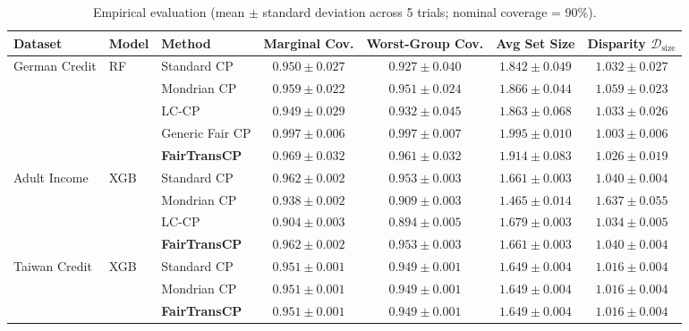 \documentclass[11pt,a4paper]{article}
\begin{document}
\begin{table}[htbp]
\centering
\small
\begin{tabularx}{\textwidth}{@{}lllcccc@{}}
\toprule
\textbf{Dataset} & \textbf{Model} & \textbf{Method} & \textbf{Marginal Cov.} & \textbf{Worst-Group Cov.} & \textbf{Avg Set Size} & \textbf{Disparity $\mathcal{D}_{\text{size}}$} \\
\midrule
German Credit & RF & Standard CP & $0.950 \pm 0.027$ & $0.927 \pm 0.040$ & $1.842 \pm 0.049$ & $1.032 \pm 0.027$ \\
& & Mondrian CP & $0.959 \pm 0.022$ & $0.951 \pm 0.024$ & $1.866 \pm 0.044$ & $1.059 \pm 0.023$ \\
& & LC-CP & $0.949 \pm 0.029$ & $0.932 \pm 0.045$ & $1.863 \pm 0.068$ & $1.033 \pm 0.026$ \\
& & Generic Fair CP & $0.997 \pm 0.006$ & $0.997 \pm 0.007$ & $1.995 \pm 0.010$ & $1.003 \pm 0.006$ \\
& & \textbf{FairTransCP} & $\mathbf{0.969 \pm 0.032}$ & $\mathbf{0.961 \pm 0.032}$ & $\mathbf{1.914 \pm 0.083}$ & $\mathbf{1.026 \pm 0.019}$ \\
\midrule
Adult Income & XGB & Standard CP & $0.962 \pm 0.002$ & $0.953 \pm 0.003$ & $1.661 \pm 0.003$ & $1.040 \pm 0.004$ \\
& & Mondrian CP & $0.938 \pm 0.002$ & $0.909 \pm 0.003$ & $1.465 \pm 0.014$ & $\mathbf{1.637 \pm 0.055}$ \\
& & LC-CP & $0.904 \pm 0.003$ & $0.894 \pm 0.005$ & $1.679 \pm 0.003$ & $1.034 \pm 0.005$ \\
& & \textbf{FairTransCP} & $\mathbf{0.962 \pm 0.002}$ & $\mathbf{0.953 \pm 0.003}$ & $\mathbf{1.661 \pm 0.003}$ & $\mathbf{1.040 \pm 0.004}$ \\
\midrule
Taiwan Credit & XGB & Standard CP & $0.951 \pm 0.001$ & $0.949 \pm 0.001$ & $1.649 \pm 0.004$ & $1.016 \pm 0.004$ \\
& & Mondrian CP & $0.951 \pm 0.001$ & $0.949 \pm 0.001$ & $1.649 \pm 0.004$ & $1.016 \pm 0.004$ \\
& & \textbf{FairTransCP} & $\mathbf{0.951 \pm 0.001}$ & $\mathbf{0.949 \pm 0.001}$ & $\mathbf{1.649 \pm 0.004}$ & $\mathbf{1.016 \pm 0.004}$ \\
\bottomrule
\end{tabularx}
\caption{Empirical evaluation (mean $\pm$ standard deviation across 5 trials; nominal coverage = 90\%).}
\label{tab:results}
\end{table}
\end{document}

